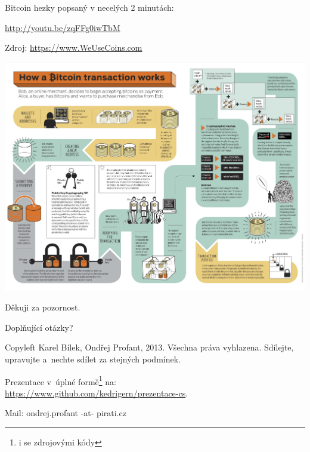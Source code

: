 \documentclass[xetex]{beamer}
\begin{document}
\begin{frame}
	Bitcoin hezky popsaný v necelých 2 minutách:

	\url{http://youtu.be/zqFFg0iwTbM}

	Zdroj: \url{https://www.WeUseCoins.com}
\end{frame}

\begin{frame}
	\includegraphics[scale=0.37]{images/how-a-bitcoin-transaction-works.jpg}
\end{frame}


\begin{frame}

	Děkuji za pozornost.

	\bigskip
	
	Doplňující otázky?

	\bigskip

	\bigskip

	\scriptsize
	Copyleft Karel Bílek, Ondřej Profant, 2013. Všechna práva vyhlazena. Sdílejte, upravujte a~nechte sdílet za stejných podmínek. 

	\bigskip

	Prezentace v~úplné formě\footnote{i se zdrojovými kódy} na:\\ 
	\url{https://www.github.com/kedrigern/prezentace-cs}.

	\bigskip

	Mail: ondrej.profant -at- pirati.cz 
\end{frame}
\end{document}
